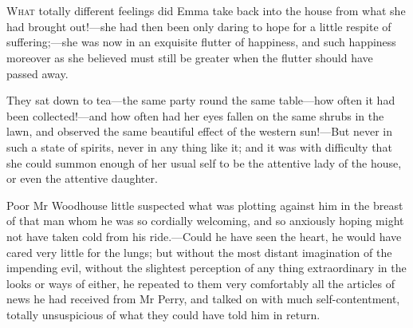 \chapter[Chapter \thechapter]{}
\lettrine[lraise=0.3]{W}{hat} totally different feelings did Emma take back into the house from what she had brought out!—she had then been only daring to hope for a little respite of suffering;—she was now in an exquisite flutter of happiness, and such happiness moreover as she believed must still be greater when the flutter should have passed away.

They sat down to tea—the same party round the same table—how often it had been collected!—and how often had her eyes fallen on the same shrubs in the lawn, and observed the same beautiful effect of the western sun!—But never in such a state of spirits, never in any thing like it; and it was with difficulty that she could summon enough of her usual self to be the attentive lady of the house, or even the attentive daughter.

Poor Mr Woodhouse little suspected what was plotting against him in the breast of that man whom he was so cordially welcoming, and so anxiously hoping might not have taken cold from his ride.—Could he have seen the heart, he would have cared very little for the lungs; but without the most distant imagination of the impending evil, without the slightest perception of any thing extraordinary in the looks or ways of either, he repeated to them very comfortably all the articles of news he had received from Mr Perry, and talked on with much self-contentment, totally unsuspicious of what they could have told him in return.

